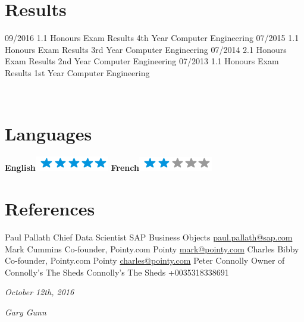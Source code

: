 \documentclass[]{friggeri-cv}
\begin{document}
\section{Results}
\begin{entrylist}
  \entry
    {09/2016}
    {1.1 Honours}
    {Exam Results}
    {4th Year Computer Engineering}
  \entry
    {07/2015}
    {1.1 Honours}
    {Exam Results}
    {3rd Year Computer Engineering}
  \entry
    {07/2014}
    {2.1 Honours}
    {Exam Results}
    {2nd Year Computer Engineering}
  \entry
    {07/2013}
    {1.1 Honours}
    {Exam Results}
    {1st Year Computer Engineering}

\end{entrylist}

\newpage

\begin{aside}
~
~
~
  \section{Languages}
    \textbf{English}\includegraphics[scale=0.40]{img/5stars.png}
    \textbf{French}\includegraphics[scale=0.40]{img/2stars.png}
    ~
\end{aside}


\section{References}
\begin{entrylist}
  \entry
    {Paul Pallath}
    {Chief Data Scientist}
    {SAP Business Objects}
    {\href{paul.pallath@sap.com}{paul.pallath@sap.com}}
  \entry
    {Mark Cummins}
    {Co-founder, Pointy.com}
    {Pointy}
    {\href{mark@pointy.com}{mark@pointy.com}}
  \entry
    {Charles Bibby}
    {Co-founder, Pointy.com}
    {Pointy}
    {\href{charles@pointy.com}{charles@pointy.com}}
  \entry
    {Peter Connolly}
    {Owner of Connolly's The Sheds}
    {Connolly's The Sheds}
    {+0035318338691}
    
    
\end{entrylist}


\begin{flushleft}
\emph{October 12th, 2016}
\end{flushleft}
\begin{flushright}
\emph{Gary Gunn}
\end{flushright}
\end{document}
